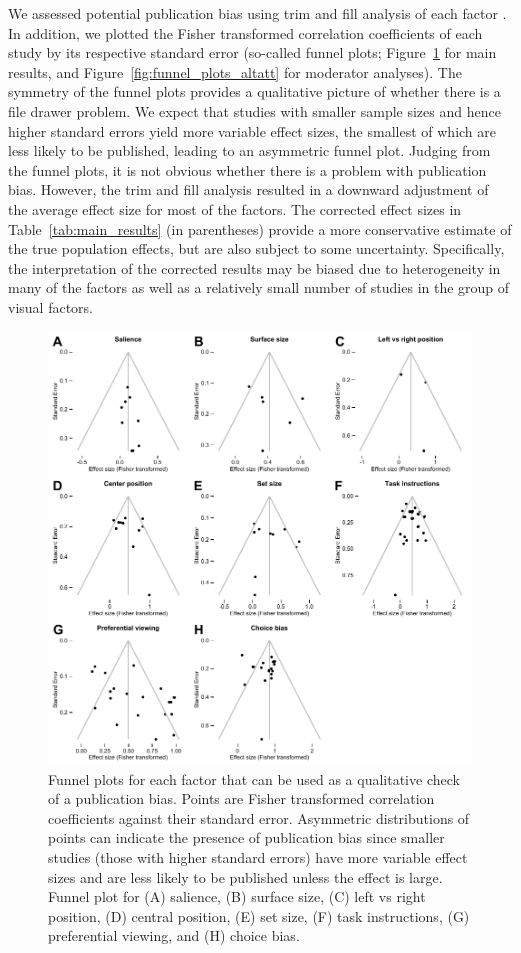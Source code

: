 \documentclass[english,natbib,man,floatsintext]{apa6}
\begin{document}
We assessed potential publication bias using trim and fill analysis of each factor \citep{duval2000trim}. In addition, we plotted the  Fisher transformed correlation coefficients of each study by its respective standard error (so-called funnel plots; Figure~\ref{fig:funnel_plots} for main results, and Figure~\ref{fig:funnel_plots_altatt} for moderator analyses). The symmetry of the funnel plots provides a qualitative picture of whether there is a file drawer problem. We expect that studies with smaller sample sizes and hence higher standard errors yield more variable effect sizes, the smallest of which are less likely to be published, leading to an asymmetric funnel plot. Judging from the funnel plots, it is not obvious whether there is a problem with publication bias. However, the trim and fill analysis resulted in a downward adjustment of the average effect size for most of the factors. The corrected effect sizes in Table~\ref{tab:main_results} (in parentheses) provide a more conservative estimate of the true population effects, but are also subject to some uncertainty. Specifically, the interpretation of the corrected results may be biased due to heterogeneity in many of the factors as well as a relatively small number of studies in the group of visual factors. 


\begin{figure}[!h]
\includegraphics{funnel_plots}
\centering
\caption{Funnel plots for each factor that can be used as a qualitative check of a publication bias. Points are Fisher transformed correlation coefficients against their standard error. Asymmetric distributions of points can indicate the presence of publication bias since smaller studies (those with higher standard errors) have more variable effect sizes and are less likely to be published unless the effect is large. Funnel plot for (A) salience, (B) surface size, (C) left vs right position, (D) central position, (E) set size, (F) task instructions, (G) preferential viewing, and (H) choice bias.}
\label{fig:funnel_plots}
\end{figure}
\end{document}
